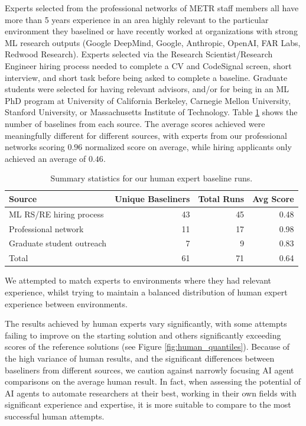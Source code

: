 \documentclass{article}
\begin{document}
Experts selected from the professional networks of METR staff members all have more than 5 years experience in an area highly relevant to the particular environment they baselined or have recently worked at organizations with strong ML research outputs (Google DeepMind, Google, Anthropic, OpenAI, FAR Labs, Redwood Research). Experts selected via the Research Scientist/Research Engineer hiring process needed to complete a CV and CodeSignal screen, short interview, and short task before being asked to complete a baseline. Graduate students were selected for having relevant advisors, and/or for being in an ML PhD program at University of California Berkeley, Carnegie Mellon University, Stanford University, or Massachusetts Institute of Technology. Table \ref{table:baseline-sourcing} shows the number of baselines from each source. The average scores achieved were meaningfully different for different sources, with experts from our professional networks scoring $0.96$ normalized score on average, while hiring applicants only achieved an average of $0.46$.

\begin{table}[t]
\centering
\begin{tabular}{lrrr}
\toprule
\textbf{Source} & \textbf{Unique Baseliners} & \textbf{Total Runs} & \textbf{Avg Score} \\
\midrule
ML RS/RE hiring process & 43 & 45 & 0.48 \\
Professional network & 11 & 17 & 0.98 \\
Graduate student outreach & 7 & 9 & 0.83 \\
\midrule
Total & 61 & 71 & 0.64 \\
\bottomrule
\end{tabular}
\vspace{1em}
\caption{Summary statistics for our human expert baseline runs. \label{table:baseline-sourcing}}
\end{table}

We attempted to match experts to environments where they had relevant experience, whilst trying to maintain a balanced distribution of human expert experience between environments.

The results achieved by human experts vary significantly, with some attempts failing to improve on the starting solution and others significantly exceeding scores of the reference solutions (see Figure \ref{fig:human_quantiles}). Because of the high variance of human results, and the significant differences between baseliners from different sources, we caution against narrowly focusing AI agent comparisons on the average human result. In fact, when assessing the potential of AI agents to automate researchers at their best, working in their own fields with significant experience and expertise, it is more suitable to compare to the most successful human attempts.
\end{document}
